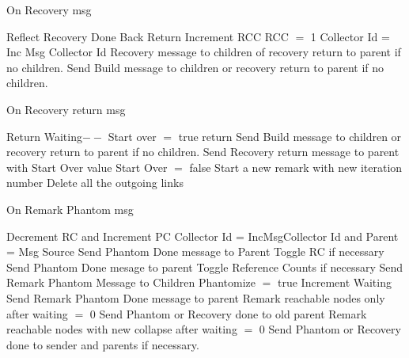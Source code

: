 \documentclass{article}
\begin{document}
\begin{algorithm}
\caption{On Recovery msg}
\label{Recovery message received}
\begin{algorithmic}[1]
\State Reflect Recovery Done Back
\State Return
\State Increment RCC
\Else
\State RCC $=$ 1
\State Collector Id = Inc Msg Collector Id
\EndIf
{}
\State Recovery message to children of recovery return to parent if no children.
\EndIf
{} 
\State Send Build message to children or recovery return to parent if no children.
\EndIf
\EndProcedure
\end{algorithmic}
\end{algorithm}	


\begin{algorithm}
\caption{On Recovery return msg}
\label{Recovery return message received}
\begin{algorithmic}[1]
\State Return
\EndIf
\State Waiting$--$
\State Start over $=$ true
\EndIf
{}
\State return
\EndIf
{}
\State Send Build message to children or recovery return to parent if no children.
\State Send Recovery return message to parent with Start Over value
\State Start Over $=$ false
\EndIf
{}
\State Start a new remark with new iteration number
\State Delete all the outgoing links
\EndIf
\EndProcedure
\end{algorithmic}
\end{algorithm}	

\begin{algorithm}
\caption{On Remark Phantom msg}
\label{Remark Phantom message received}
\begin{algorithmic}[1]
\State Decrement RC and Increment PC
\State Collector Id = IncMsgCollector Id and Parent = Msg Source
\State Send Phantom Done message to Parent
\State Toggle RC if necessary
\State Send Phantom Done mesage to parent
\Else
\State Toggle Reference Counts if necessary
\State Send Remark Phantom Message to Children
\State Phantomize $=$ true
\State Increment Waiting
\EndIf
{}
\State Send Remark Phantom Done message to parent
\State Remark reachable nodes only after waiting $=$ 0
\State Send Phantom or Recovery done to old parent
\Else
\State Remark reachable nodes with new collapse after waiting $=$ 0
\State Send Phantom or Recovery done to sender and parents if necessary.
\EndIf
\EndProcedure
\end{algorithmic}
\end{algorithm}	
\end{document}
